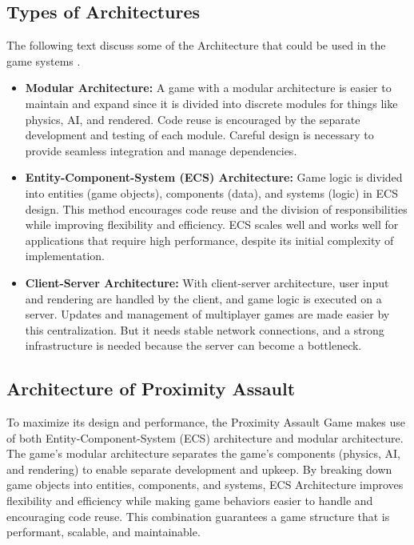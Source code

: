 \subsection{Types of Architectures}
The following text discuss some of the Architecture that could be used in the game systems \cite{unity_architecture}.
\begin{itemize}
	\item \textbf{Modular Architecture: }A game with a modular architecture is easier to maintain and expand since it is divided into discrete modules for things like physics, AI, and rendered. Code reuse is encouraged by the separate development and testing of each module. Careful design is necessary to provide seamless integration and manage dependencies.
	\item \textbf{Entity-Component-System (ECS) Architecture: }Game logic is divided into entities (game objects), components (data), and systems (logic) in ECS design. This method encourages code reuse and the division of responsibilities while improving flexibility and efficiency. ECS scales well and works well for applications that require high performance, despite its initial complexity of implementation.
	\item \textbf{Client-Server Architecture: }With client-server architecture, user input and rendering are handled by the client, and game logic is executed on a server. Updates and management of multiplayer games are made easier by this centralization. But it needs stable network connections, and a strong infrastructure is needed because the server can become a bottleneck.
\end{itemize}

\subsection{Architecture of Proximity Assault}
To maximize its design and performance, the Proximity Assault Game makes use of both Entity-Component-System (ECS) architecture and modular architecture. The game's modular architecture separates the game's components (physics, AI, and rendering) to enable separate development and upkeep. By breaking down game objects into entities, components, and systems, ECS Architecture improves flexibility and efficiency while making game behaviors easier to handle and encouraging code reuse. This combination guarantees a game structure that is performant, scalable, and maintainable.

